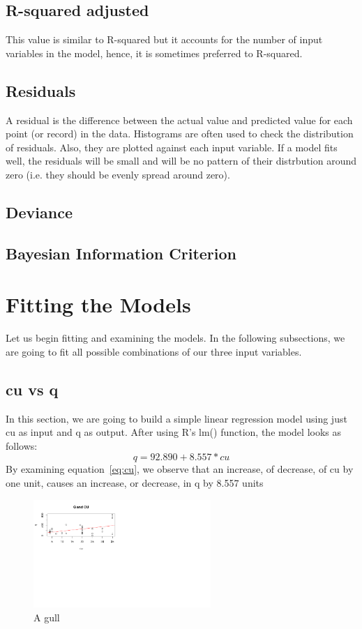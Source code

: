 \documentclass[a4paper,12pt, english]{article}
\begin{document}
\subsection{R-squared adjusted}
This value is similar to R-squared but it accounts for the number of input variables in the model, hence, it is sometimes preferred to R-squared.
\subsection{Residuals}
A residual is the difference between the actual value and predicted value for each point (or record) in the data. Histograms are often used to check the distribution of residuals. Also, they are plotted against each input variable. If a model fits well, the residuals will be small and will be no pattern of their distrbution around zero (i.e. they should be evenly spread around zero).
\subsection{Deviance}
\subsection{Bayesian Information Criterion}

\section{Fitting the Models}
Let us begin fitting and examining the models. In the following subsections, we are going to fit all possible combinations of our three input variables.
\subsection{cu vs q} 
In this section, we are going to build a simple linear regression model using just cu as input and q as output. After using R's lm() function, the model looks as follows:\\
\begin{equation}
\label{eq:cu}
q = 92.890    +    8.557*cu 
\end{equation}       
By examining equation~\ref{eq:cu}, we observe that an increase, of decrease, of cu by one unit, causes an increase, or decrease, in q by 8.557 units
\begin{figure}[h!]
  \centering
  \includegraphics[width=0.6\textwidth]{cu-line}
  \caption{A gull}
  \label{fig:cu-line}
\end{figure}
\end{document}
